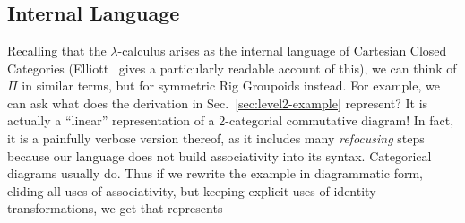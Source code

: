\documentclass{article}
\begin{document}
\begin{samepage}
\begin{code}
\AgdaSymbol{)}\AgdaSpace{}%
\<%
\\
%
\>[2]\AgdaSymbol{((}\AgdaSpace{}%
\AgdaSpace{}%
\AgdaSymbol{)}\AgdaSpace{}%
\AgdaSpace{}%
%
\>[28]\AgdaSpace{}%
\AgdaSymbol{(}\AgdaSpace{}%
\AgdaSpace{}%
\AgdaSymbol{))}%
\>[75]\AgdaSpace{}%
\AgdaSpace{}%
\AgdaSpace{}%
\AgdaSpace{}%
\<%
\\
%
\>[2]\AgdaSymbol{((}\AgdaSpace{}%
\AgdaSpace{}%
\AgdaSymbol{)}%
\>[22]\AgdaSpace{}%
\AgdaSymbol{(}\AgdaSpace{}%
\AgdaSpace{}%
\AgdaSymbol{))}%
\>[75]\AgdaSpace{}%
\AgdaSpace{}%
\<%
\\
%
\>[2]\AgdaSymbol{((}\AgdaSpace{}%
\AgdaSpace{}%
\AgdaSpace{}%
\AgdaSpace{}%
\AgdaSymbol{(}\AgdaSpace{}%
\AgdaSpace{}%
\AgdaSymbol{))}\AgdaSpace{}%
\AgdaSymbol{)}\<%
\end{code}
\end{samepage}

\renewcommand{\AgdaIndentSpace}{\AgdaSpace{}$\;\;$}

\subsection{Internal Language}

Recalling that the $\lambda$-calculus arises as the internal language
of Cartesian Closed Categories (Elliott~\cite{Elliott-2017} gives a particularly
readable account of this), we can think of $\Pi$ in similar terms, but
for symmetric Rig Groupoids instead. For example, we can ask what does
the derivation in Sec.~\ref{sec:level2-example} represent? It is
actually a ``linear'' representation of a 2-categorial commutative
diagram! In fact, it is a painfully verbose version thereof, as it
includes many \emph{refocusing} steps because our language does not
build associativity into its syntax. Categorical diagrams usually do.
Thus if we rewrite the example in diagrammatic form, eliding all uses
of associativity, but keeping explicit uses of identity transformations,
we get that  represents
\end{document}
